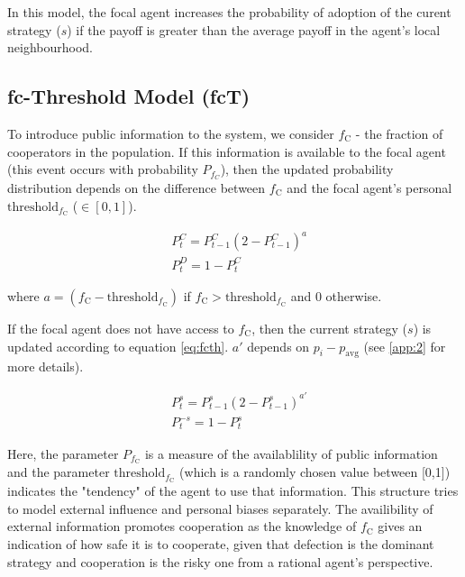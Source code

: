 \documentclass[11pt, A4 paper, twocolumn ]{article}
\newcommand{\fc}{$ f_{\text{C}} $}
\newcommand{\fcm}{f_{\text{C}}}
\begin{document}
			In this model, the focal agent increases the probability of adoption of the curent strategy ($ s $)  if the payoff is greater than the average payoff in the agent's local neighbourhood. 
	
 	\subsection{fc-Threshold Model (fcT)}
 	To introduce public information to the system, we consider $ f_{\text{C}} $ - the fraction of cooperators in the population. If this information is available to the focal agent (this event occurs with probability $ P_{f_{C}}$), then the updated probability distribution depends on the difference between \fc{} and the focal agent's personal $ \text{threshold}_{\fcm} $ ($ \in [0,1] $). 
 	
 	\begin{equation}\label{fcth-info}
 		\begin{split}
 				&P_{t}^{C} = P_{t-1}^{C}(2-P_{t-1}^{C})^{a} \\
 				&P_{t}^{D} = 1 - P_{t}^{C}
 		\end{split}
 	\end{equation}
 
 where $ a  = (\fcm - \text{threshold}_{\fcm})$ if $\fcm > \text{threshold}_{\fcm}$  and $ 0 $ otherwise. \par 
 If the focal agent does not have access to \fc, then the current strategy ($ s $) is updated according to equation \ref{eq:fcth}. $ a' $ depends on $ p_{i} - p_{\text{avg}} $ (see \ref{app:2} for more details). 
 
 \begin{equation} \label{eq:fcth}
 	\begin{split}
 		&P_{t}^{s} = P_{t-1}^{s}(2-P_{t-1}^{s})^{a'} \\
 		&P_{t}^{-s} = 1 - P_{t}^{s}
 	\end{split}
 \end{equation}

Here, the parameter $ P_{\fcm} $ is a measure of the availablility of public information and the parameter $ \text{threshold}_{\fcm} $ (which is a randomly chosen value between [0,1]) indicates the "tendency" of the agent to use that information. This structure tries to model external influence and personal biases separately. The availibility of external information promotes cooperation as the knowledge of \fc{} gives an indication of how safe it is to cooperate, given that defection is the dominant strategy and cooperation is the risky one from a rational agent's perspective. 
\end{document}
